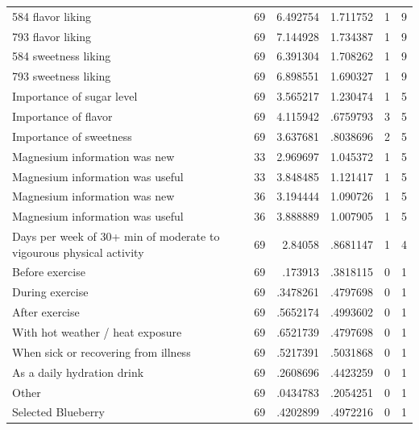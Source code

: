 \begin{tabular*}{\textwidth}{@{\extracolsep{\fill}}l*{5}{r}}
584 flavor liking   &          69&    6.492754&    1.711752&           1&           9\\
793 flavor liking   &          69&    7.144928&    1.734387&           1&           9\\
584 sweetness liking&          69&    6.391304&    1.708262&           1&           9\\
793 sweetness liking&          69&    6.898551&    1.690327&           1&           9\\
Importance of sugar level&          69&    3.565217&    1.230474&           1&           5\\
Importance of flavor&          69&    4.115942&    .6759793&           3&           5\\
Importance of sweetness&          69&    3.637681&    .8038696&           2&           5\\
Magnesium information was new&          33&    2.969697&    1.045372&           1&           5\\
Magnesium information was useful&          33&    3.848485&    1.121417&           1&           5\\
Magnesium information was new&          36&    3.194444&    1.090726&           1&           5\\
Magnesium information was useful&          36&    3.888889&    1.007905&           1&           5\\
Days per week of 30+ min of moderate to vigourous physical activity&          69&     2.84058&    .8681147&           1&           4\\
Before exercise     &          69&     .173913&    .3818115&           0&           1\\
During exercise     &          69&    .3478261&    .4797698&           0&           1\\
After exercise      &          69&    .5652174&    .4993602&           0&           1\\
With hot weather / heat exposure&          69&    .6521739&    .4797698&           0&           1\\
When sick or recovering from illness&          69&    .5217391&    .5031868&           0&           1\\
As a daily hydration drink&          69&    .2608696&    .4423259&           0&           1\\
Other               &          69&    .0434783&    .2054251&           0&           1\\
Selected Blueberry  &          69&    .4202899&    .4972216&           0&           1\\

\end{tabular*}

